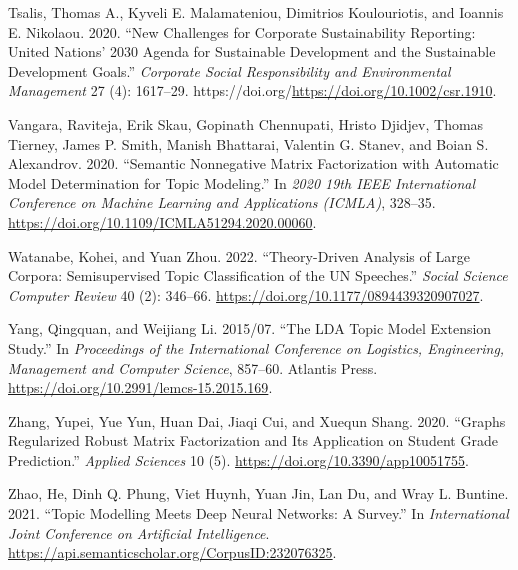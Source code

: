 \documentclass[
]{article}
\newlength{\cslhangindent}
\newlength{\cslentryspacingunit} %
\newenvironment{CSLReferences}[2] %
 {%
  \setlength{\parindent}{0pt}
  \ifodd #1
  \let\oldpar\par
  \def\par{\hangindent=\cslhangindent\oldpar}
  \fi
  \setlength{\parskip}{#2\cslentryspacingunit}
 }%
 {}
\begin{document}
\begin{CSLReferences}{1}{0}
\leavevmode{}%
Tsalis, Thomas A., Kyveli E. Malamateniou, Dimitrios Koulouriotis, and Ioannis E. Nikolaou. 2020. {``New Challenges for Corporate Sustainability Reporting: United Nations' 2030 Agenda for Sustainable Development and the Sustainable Development Goals.''} \emph{Corporate Social Responsibility and Environmental Management} 27 (4): 1617--29. https://doi.org/\url{https://doi.org/10.1002/csr.1910}.

\leavevmode{}%
Vangara, Raviteja, Erik Skau, Gopinath Chennupati, Hristo Djidjev, Thomas Tierney, James P. Smith, Manish Bhattarai, Valentin G. Stanev, and Boian S. Alexandrov. 2020. {``Semantic Nonnegative Matrix Factorization with Automatic Model Determination for Topic Modeling.''} In \emph{2020 19th IEEE International Conference on Machine Learning and Applications (ICMLA)}, 328--35. \url{https://doi.org/10.1109/ICMLA51294.2020.00060}.

\leavevmode{}%
Watanabe, Kohei, and Yuan Zhou. 2022. {``Theory-Driven Analysis of Large Corpora: Semisupervised Topic Classification of the UN Speeches.''} \emph{Social Science Computer Review} 40 (2): 346--66. \url{https://doi.org/10.1177/0894439320907027}.

\leavevmode{}%
Yang, Qingquan, and Weijiang Li. 2015/07. {``The LDA Topic Model Extension Study.''} In \emph{Proceedings of the International Conference on Logistics, Engineering, Management and Computer Science}, 857--60. Atlantis Press. \url{https://doi.org/10.2991/lemcs-15.2015.169}.

\leavevmode{}%
Zhang, Yupei, Yue Yun, Huan Dai, Jiaqi Cui, and Xuequn Shang. 2020. {``Graphs Regularized Robust Matrix Factorization and Its Application on Student Grade Prediction.''} \emph{Applied Sciences} 10 (5). \url{https://doi.org/10.3390/app10051755}.

\leavevmode{}%
Zhao, He, Dinh Q. Phung, Viet Huynh, Yuan Jin, Lan Du, and Wray L. Buntine. 2021. {``Topic Modelling Meets Deep Neural Networks: A Survey.''} In \emph{International Joint Conference on Artificial Intelligence}. \url{https://api.semanticscholar.org/CorpusID:232076325}.

\end{CSLReferences}
\end{document}
